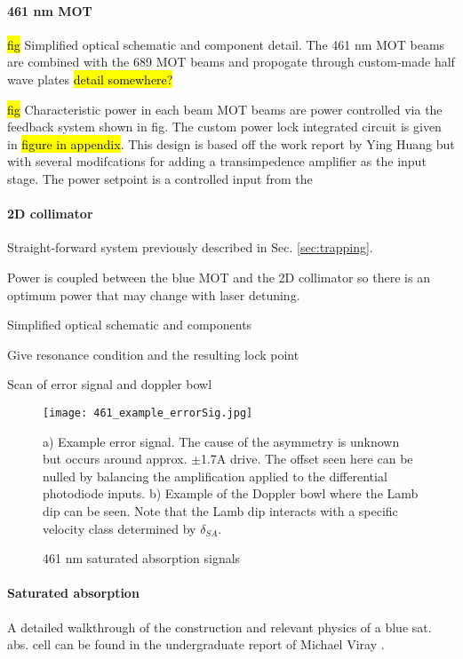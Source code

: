 \paragraph{461 nm MOT}

\hl{fig} Simplified optical schematic and component detail.
The 461 nm MOT beams are combined with the 689 MOT beams and propogate through custom-made half wave plates \hl{detail somewhere?}

\hl{fig}
Characteristic power in each beam
MOT beams are power controlled via the feedback system shown in fig.
The custom power lock integrated circuit is given in \hl{figure in appendix}.
This design is based off the work report by Ying Huang but with several modifcations for adding a transimpedence amplifier as the input stage.
The power setpoint is a controlled input from the 

\paragraph{2D collimator}
Straight-forward system previously described in Sec. \ref{sec:trapping}.

Power is coupled between the blue MOT and the 2D collimator so there is an optimum power that may change with laser detuning. 

Simplified optical schematic and components

Give resonance condition and the resulting lock point

Scan of error signal and doppler bowl
	\begin{figure}
		\centerline{
		\texttt{[image: 461\_example\_errorSig.jpg]}}
		\caption{461 nm saturated absorption signals}{a) Example error signal. The cause of the asymmetry is unknown but occurs around approx. $\pm$1.7A drive. The offset seen here can be nulled by balancing the amplification applied to the differential photodiode inputs. b) Example of the Doppler bowl where the Lamb dip can be seen. Note that the Lamb dip interacts with a specific velocity class determined by $\delta_{SA}$.}
		\label{fig:461zeemanBeam}
	\end{figure}

\paragraph{Saturated absorption}

A detailed walkthrough of the construction and relevant physics of a blue sat. abs. cell can be found in the undergraduate report of Michael Viray \cite{MichaelViray2014}.

